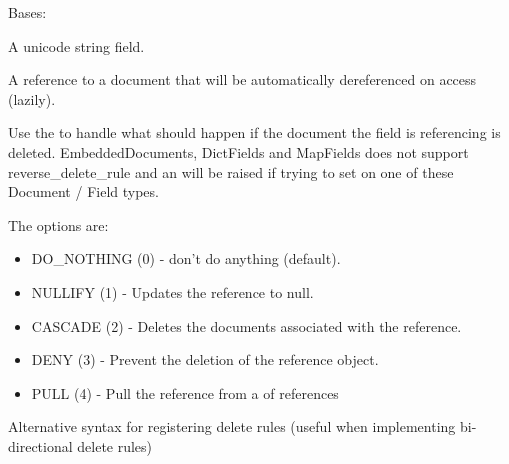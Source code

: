 \documentclass[letterpaper,10pt,english]{sphinxmanual}
\begin{document}
\begin{fulllineitems}
\label{\detokenize{flashcard_response:flashcard_response.FlashcardResponse}}
Bases: 

\begin{fulllineitems}
\label{\detokenize{flashcard_response:flashcard_response.FlashcardResponse.answer}}
A unicode string field.

\end{fulllineitems}


\begin{fulllineitems}
\label{\detokenize{flashcard_response:flashcard_response.FlashcardResponse.flashcard}}
A reference to a document that will be automatically dereferenced on
access (lazily).

Use the  to handle what should happen if the document
the field is referencing is deleted.  EmbeddedDocuments, DictFields and
MapFields does not support reverse\_delete\_rule and an 
will be raised if trying to set on one of these Document / Field types.

The options are:
\begin{itemize}
\item {} 
DO\_NOTHING (0)  - don't do anything (default).

\item {} 
NULLIFY    (1)  - Updates the reference to null.

\item {} 
CASCADE    (2)  - Deletes the documents associated with the reference.

\item {} 
DENY       (3)  - Prevent the deletion of the reference object.

\item {} 
PULL       (4)  - Pull the reference from a  of references

\end{itemize}

Alternative syntax for registering delete rules (useful when implementing
bi-directional delete rules)


\end{fulllineitems}
\end{fulllineitems}
\end{document}
